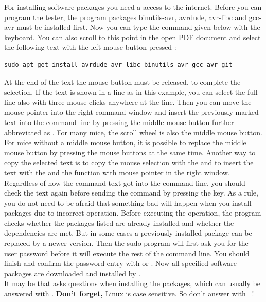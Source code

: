 For installing software packages you need a access to the internet.
Before you can program the tester, the program packages
binutils-avr, avrdude, avr-libc and gcc-avr must be installed first.
Now you can type the command given below with the keyboard.
You can also scroll to this point in the open PDF document and select the
following text with the left mouse button pressed \LMB :
\begin{large} \vspace{-0.4em} \begin{verbatim}
sudo apt-get install avrdude avr-libc binutils-avr gcc-avr git
\end{verbatim} \end{large}
At the end of the text the mouse button \LMB must be released,
to complete the selection.
If the text is shown in a line as in this example, you can select the full line also
with three \LMB mouse clicks anywhere at the line.
Then you can move the mouse pointer into the right command window and
insert the previously marked text into the command line by pressing the
middle mouse button {further abbreviated as \MMB }.
For many mice, the scroll wheel is also the middle mouse button.
For mice without a middle mouse button, it is possible to replace the middle mouse button
by pressing the \LRMB mouse buttons at the same time.
Another way to copy the selected text is to copy the mouse selection with the
 and to insert the text with the \RMB and the function 
 with mouse pointer in the right window.
Regardless of how the command text got into the command line,
you should check the text again before sending the command by pressing the \keys{\enter} key.
As a rule, you do not need to be afraid that something bad will happen when you install packages
due to incorrect operation.
Before executing the operation, the  program checks whether the packages listed
are already installed and whether the dependencies are met.
But in some cases a previously installed package can be replaced by a newer version.
Then the sudo program will first ask you for the user password before it
will execute the rest of the command line.
You should finish and confirm the password entry with \keys{\enter} or \keys{\return}. 
Now all specified software packages are downloaded and installed by .\\

It may be that  asks questions when installing the packages,
which can usually be answered with .
\textbf{Don't forget,} Linux is case sensitive. So don't answer with ~!

